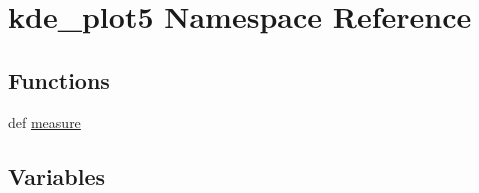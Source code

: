 \hypertarget{namespacekde__plot5}{}\section{kde\+\_\+plot5 Namespace Reference}
\label{namespacekde__plot5}
\subsection*{Functions}
\begin{DoxyCompactItemize}
\item 
def \hyperlink{namespacekde__plot5_a6be8978a5f58e8561839d8e21cc16518}{measure}
\end{DoxyCompactItemize}
\subsection*{Variables}
